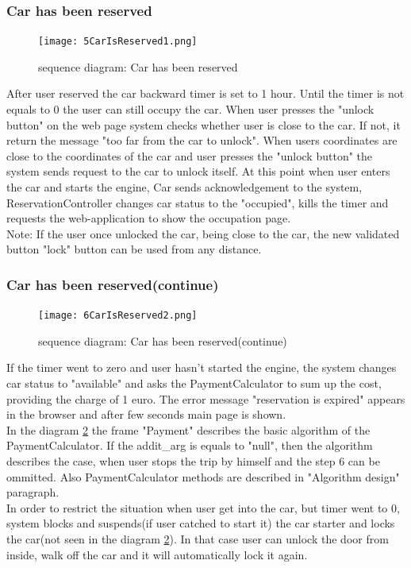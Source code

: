 \documentclass[12pt, letterpaper]{article}
\begin{document}
\subsubsection{Car has been reserved}
\begin{figure}[H]
\centering
\texttt{[image: 5CarIsReserved1.png]} 
\caption{sequence diagram: Car has been reserved}
\label{fig:5CarIsReserved1}
\end{figure}
\newpage
After user reserved the car backward timer is set to 1 hour. Until the timer is not equals to 0 the user can still occupy the car. When user presses the "unlock button" on the web page system checks whether user is close to the car. If not, it return the message "too far from the car to unlock". When users coordinates are close to the coordinates of the car and user presses the "unlock button" the system sends request to the car to unlock itself. At this point when user enters the car and starts the engine, Car sends acknowledgement to the system, ReservationController changes car status to the "occupied", kills the timer and requests the web-application to show the occupation page. \\ 
Note: If the user once unlocked the car, being close to the car, the new validated button "lock" button can be used from any distance. \\
\newpage
\subsubsection{Car has been reserved(continue)}
\begin{figure}[H]
\centering
\texttt{[image: 6CarIsReserved2.png]}
\caption{sequence diagram: Car has been reserved(continue)} 
\label{fig:6CarIsReserved2}
\end{figure}
\newpage
If the timer went to zero and user hasn't started the engine, the system changes car status to "available" and asks the PaymentCalculator to sum up the cost, providing the charge of 1 euro. The error message "reservation is expired" appears in the browser and after few seconds main page is shown.  \\
In the diagram \ref{fig:6CarIsReserved2} the frame "Payment" describes the basic algorithm of the PaymentCalculator. If the addit\_arg is equals to "null", then the algorithm describes the case, when user stops the trip by himself and the step 6 can be ommitted. Also PaymentCalculator methods are described in "Algorithm design" paragraph. \\
In order to restrict the situation when user get into the car, but timer went to 0, system blocks and suspends(if user catched to start it) the car starter and locks the car(not seen in the diagram \ref{fig:6CarIsReserved2}). In that case user can unlock the door from inside, walk off the car and it will automatically lock it again.
\newpage
\end{document}
